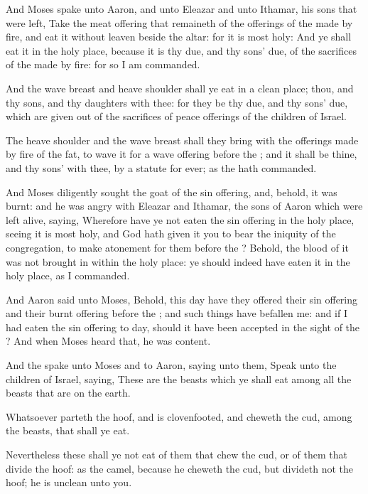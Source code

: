 \Verse And Moses spake unto Aaron, and unto Eleazar and unto Ithamar, his sons that were left, Take the meat offering that remaineth of the offerings of the \LORD made by fire, and eat it without leaven beside the altar: for it is most holy: \Verse And ye shall eat it in the holy place, because it is thy due, and thy sons' due, of the sacrifices of the \LORD made by fire: for so I am commanded.

\Verse And the wave breast and heave shoulder shall ye eat in a clean place; thou, and thy sons, and thy daughters with thee: for they be thy due, and thy sons' due, which are given out of the sacrifices of peace offerings of the children of Israel.

\Verse The heave shoulder and the wave breast shall they bring with the offerings made by fire of the fat, to wave it for a wave offering before the \LORD; and it shall be thine, and thy sons' with thee, by a statute for ever; as the \LORD hath commanded.

\Verse And Moses diligently sought the goat of the sin offering, and, behold, it was burnt: and he was angry with Eleazar and Ithamar, the sons of Aaron which were left alive, saying, \Verse Wherefore have ye not eaten the sin offering in the holy place, seeing it is most holy, and God hath given it you to bear the iniquity of the congregation, to make atonement for them before the \LORD?  \Verse Behold, the blood of it was not brought in within the holy place: ye should indeed have eaten it in the holy place, as I commanded.

\Verse And Aaron said unto Moses, Behold, this day have they offered their sin offering and their burnt offering before the \LORD; and such things have befallen me: and if I had eaten the sin offering to day, should it have been accepted in the sight of the \LORD?  \Verse And when Moses heard that, he was content.

\Chapter
\Verse And the \LORD spake unto Moses and to Aaron, saying unto them, \Verse Speak unto the children of Israel, saying, These are the beasts which ye shall eat among all the beasts that are on the earth.

\Verse Whatsoever parteth the hoof, and is clovenfooted, and cheweth the cud, among the beasts, that shall ye eat.

\Verse Nevertheless these shall ye not eat of them that chew the cud, or of them that divide the hoof: as the camel, because he cheweth the cud, but divideth not the hoof; he is unclean unto you.

